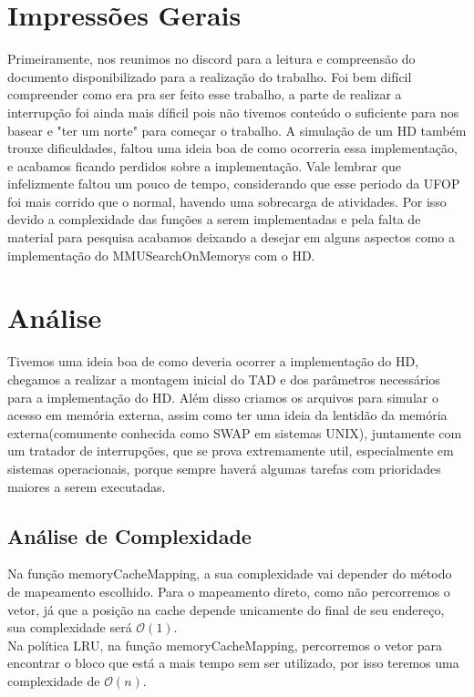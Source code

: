 \documentclass{article}
\begin{document}
\section{Impressões Gerais}
Primeiramente, nos reunimos no discord para a leitura e compreensão do documento disponibilizado para a realização do trabalho.
Foi bem difícil compreender como era pra ser feito esse trabalho, a parte de realizar a interrupção foi ainda mais díficil pois não tivemos conteúdo o 
suficiente para nos basear e "ter um norte" para começar o trabalho. A simulação de um HD também trouxe dificuldades, faltou uma ideia boa de como ocorreria essa implementação, 
e acabamos ficando perdidos sobre a implementação. Vale lembrar que infelizmente faltou um pouco de tempo, considerando que esse periodo da UFOP foi mais corrido que o normal,
havendo uma sobrecarga de atividades. Por isso devido a complexidade das funções a serem implementadas e pela falta de material para pesquisa acabamos deixando a desejar em alguns aspectos como
a implementação do MMUSearchOnMemorys com o HD.
\clearpage
\section{Análise}

Tivemos uma ideia boa de como deveria ocorrer a implementação do HD, chegamos a realizar a montagem inicial do TAD e dos parâmetros necessários para a implementação
do HD. Além disso criamos os arquivos para simular o acesso em memória externa, assim como ter uma ideia da lentidão da memória externa(comumente conhecida como SWAP em sistemas UNIX),
juntamente com um tratador de interrupções, que se prova extremamente util, especialmente em sistemas operacionais, porque sempre haverá algumas tarefas com prioridades maiores a serem executadas.

\subsection{Análise de Complexidade}
Na função memoryCacheMapping, a sua complexidade vai depender do método de mapeamento escolhido. Para o mapeamento direto, 
como não percorremos o vetor, já que a posição na cache depende unicamente do final de seu endereço, 
sua complexidade será $\mathcal{O}(1)$. \\

Na política LRU, na função memoryCacheMapping, percorremos o vetor para encontrar o bloco que está a mais tempo sem ser utilizado, por isso 
teremos uma complexidade de $\mathcal{O}(n)$. \\
\end{document}

